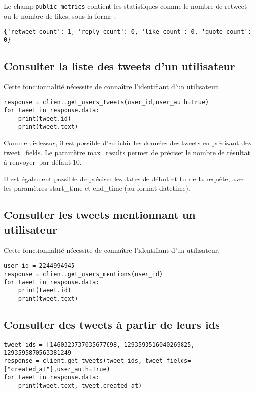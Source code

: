 \documentclass[11pt,a4paper]{article}
\begin{document}
Le champ \verb+public_metrics+ contient les statistiques comme le nombre de retweet ou le nombre de likes, sous la forme : 
\begin{verbatim}
{'retweet_count': 1, 'reply_count': 0, 'like_count': 0, 'quote_count': 0}
\end{verbatim}

\subsection{Consulter la liste des tweets d'un utilisateur}
Cette fonctionnalité nécessite de connaître l'identifiant d'un utilisateur.

\begin{lstlisting}
response = client.get_users_tweets(user_id,user_auth=True)
for tweet in response.data:
    print(tweet.id)
    print(tweet.text)
\end{lstlisting}  
Comme ci-dessus, il est possible d'enrichir les données des tweets en précisant des tweet\_fields.
Le paramètre max\_results permet de préciser le nombre de résultat à renvoyer, par défaut 10.

Il est également possible de préciser les dates de début et fin de la requête, avec les paramètres start\_time et end\_time (au format datetime). 

\subsection{Consulter les tweets mentionnant un utilisateur}
Cette fonctionnalité nécessite de connaître l'identifiant d'un utilisateur. 

\begin{lstlisting}
user_id = 2244994945
response = client.get_users_mentions(user_id)
for tweet in response.data:
    print(tweet.id)
    print(tweet.text)
\end{lstlisting} 

\subsection{Consulter des tweets à partir de leurs ids}

\begin{lstlisting}
tweet_ids = [1460323737035677698, 1293593516040269825, 1293595870563381249]
response = client.get_tweets(tweet_ids, tweet_fields=["created_at"],user_auth=True)
for tweet in response.data:
    print(tweet.text, tweet.created_at)
\end{lstlisting}  
\end{document}
